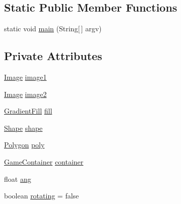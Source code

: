 \subsection*{Static Public Member Functions}
\begin{DoxyCompactItemize}
\item 
static void \mbox{\hyperlink{classorg_1_1newdawn_1_1slick_1_1tests_1_1_gradient_image_test_a8cf2005bbbfe5ed0564edd8cc376b977}{main}} (String\mbox{[}$\,$\mbox{]} argv)
\end{DoxyCompactItemize}
\subsection*{Private Attributes}
\begin{DoxyCompactItemize}
\item 
\mbox{\hyperlink{classorg_1_1newdawn_1_1slick_1_1_image}{Image}} \mbox{\hyperlink{classorg_1_1newdawn_1_1slick_1_1tests_1_1_gradient_image_test_ae84d4fb8785b6dfac7f0b59d41068de4}{image1}}
\item 
\mbox{\hyperlink{classorg_1_1newdawn_1_1slick_1_1_image}{Image}} \mbox{\hyperlink{classorg_1_1newdawn_1_1slick_1_1tests_1_1_gradient_image_test_a063cf54af53ec962eb84d8e4d66a986f}{image2}}
\item 
\mbox{\hyperlink{classorg_1_1newdawn_1_1slick_1_1fills_1_1_gradient_fill}{Gradient\+Fill}} \mbox{\hyperlink{classorg_1_1newdawn_1_1slick_1_1tests_1_1_gradient_image_test_a045faf3384f3a0bf5525718217719515}{fill}}
\item 
\mbox{\hyperlink{classorg_1_1newdawn_1_1slick_1_1geom_1_1_shape}{Shape}} \mbox{\hyperlink{classorg_1_1newdawn_1_1slick_1_1tests_1_1_gradient_image_test_a16d21ac50a35a98dd96e1e6805a2a2bd}{shape}}
\item 
\mbox{\hyperlink{classorg_1_1newdawn_1_1slick_1_1geom_1_1_polygon}{Polygon}} \mbox{\hyperlink{classorg_1_1newdawn_1_1slick_1_1tests_1_1_gradient_image_test_a5b67a3d768cd8516c7b2f63a2b8da8ef}{poly}}
\item 
\mbox{\hyperlink{classorg_1_1newdawn_1_1slick_1_1_game_container}{Game\+Container}} \mbox{\hyperlink{classorg_1_1newdawn_1_1slick_1_1tests_1_1_gradient_image_test_a33951eefaea77bf372778299a807d06a}{container}}
\item 
float \mbox{\hyperlink{classorg_1_1newdawn_1_1slick_1_1tests_1_1_gradient_image_test_adf131e114d3d83c2586f7605070087ce}{ang}}
\item 
boolean \mbox{\hyperlink{classorg_1_1newdawn_1_1slick_1_1tests_1_1_gradient_image_test_a94ae96939e1d695a4571141a25473139}{rotating}} = false
\end{DoxyCompactItemize}

